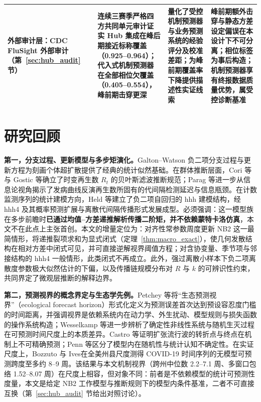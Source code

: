 \documentclass[10pt,UTF8,a4paper,zihao=-4]{ctexart}
\theoremstyle{plain}
\theoremstyle{remark}
\begin{document}
\begin{table}[htbp]
\begin{tabular}{@{}>{\raggedright\arraybackslash}p{2.45cm}>{\raggedright\arraybackslash}p{4.3cm}>{\raggedright\arraybackslash}p{4.1cm}>{\raggedright\arraybackslash}p{4.45cm}@{}}
\addlinespace[2pt]
\textbf{外部审计层}：CDC FluSight 外部审计（第~\ref{sec:hub_audit} 节） & 连续三赛季严格四方共同单元审计证实 Hub 集成在峰后期接近标称覆盖（0.925--0.964）；代入式机制预测器在全部相位欠覆盖（0.405--0.554），峰前期击穿更深 & 量化了受控机制预测器与业务预测系统的经验评分及校准差距；为峰前期覆盖率下降提供描述性实证线索 & 峰前期额外击穿与静态方差设定偏误在本设计下不可分离；相位标签为事后构造；机制预测器享有终报数据质量优势，属受控诊断基准 \\
\bottomrule
\end{tabular}
\end{table}

\section{研究回顾}\label{sec:review}

\textbf{第一，分支过程、更新模型与多步矩演化。}Galton--Watson 负二项分支过程\citep{athreya1972branching}与更新方程为刻画个体超扩散提供了经典的统计似然基础\citep{lloyd-smith2005superspreading}。在群体推断层面，Cori 等\citep{cori2013framework}与 Gostic 等\citep{gostic2020practical}确立了时变再生数 $R_t$ 的贝叶斯滤波推断规范；Parag 等\citep{parag2020information, parag2022fundamental, parag2022quantifying}进一步从信息论视角揭示了发病曲线反演再生数所固有的代间隔检测延迟与信息瓶颈。在计数监测序列的统计建模方向，Held 等\citep{held2005statistical}建立了负二项自回归的 hhh 建模结构，经 hhh4 及其概率预测扩展\citep{held2017monitoring}与离散代间隔传播形式\citep{bracher2022endemic}发展成型。必须强调：这一模型族在多步前瞻时\textbf{已通过均值--方差递推解析传播二阶矩，并不依赖蒙特卡洛仿真}，本文不在此点上主张首创。本文的增量定位为：对齐性常参数周度更新 NB2 这一最简情形，将递推裂项求和为显式闭式（定理~\ref{thm:macro_exact}），使几何发散结构在相对方差中闭式可见，并可直接逆解视界阈值方程；对含协变量、季节项与邻接结构的 hhh4 一般情形，此类闭式不再成立。此外，强过离散小样本下负二项离散度参数极大似然估计的下偏\citep{lloyd-smith2007fisher}，以及传播链规模分布对 $R$ 与 $k$ 的可辨识性约束\citep{blumberg2013inference}，共同界定了微观层推断的解释边界。

\textbf{第二，预测视界的概念界定与生态学先例。}Petchey 等\citep{petchey2015ecological}将“生态预测视界”（ecological forecast horizon）形式化定义为预测误差首次达到预设容忍度门槛的时间距离，并强调视界是依赖系统内在动力学、外生扰动、模型规则与损失函数的操作系统构造；Wesselkamp 等\citep{wesselkamp2025forecast}进一步辨析了确定性非线性系统与随机生灭过程在可预测时间尺度上的本质差异。Castro 等\citep{castro2020turning}证明扩张流行波的转折点与终点在机制上不可精确预测；Penn 等\citep{penn2023intrinsic}区分了模型内在随机性与统计认知不确定性。在实证尺度上，Bozzuto 与 Ives\citep{bozzuto2023differences}在全美州县尺度测得 COVID-19 时间序列的无模型可预测跨度至多约 8--9 周。该结果与本文机制视界（跨州中位数 2.2--7.1 周、多窗口包络 1.52--8.07 周）在尺度上相容，但对象不同：前者是不依赖模型的统计可预测性度量，本文是给定 NB2 工作模型与推断规则下的模型内条件基准，二者不可直接互换（第~\ref{sec:hub_audit} 节给出对照讨论）。
\end{document}
